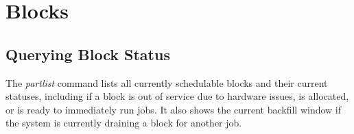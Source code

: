 \documentclass[12pt,letterpaper]{article}
\begin{document}
\section*{Blocks}

\subsection*{Querying Block Status}

The \textit{partlist} command lists all currently schedulable blocks and their current statuses, including if a block is out of service due to hardware issues, is allocated, or is ready to immediately run jobs.  It also shows the current backfill window if the system is currently draining a block for another job.
\end{document}
